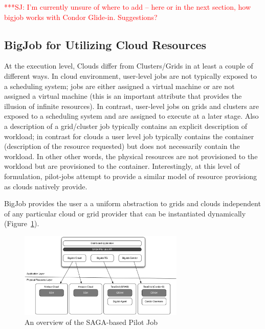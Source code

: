 \documentclass[conference,final]{IEEEtran}
\newcommand{\jhanote}[1]{ {\textcolor{red} { ***SJ: #1 }}}
\newcommand{\jhanote}[1]{}
\begin{document}
\jhanote{I'm currently unsure of where to add -- here or in the next
  section, how bigjob works with Condor Glide-in. Suggestions?}

\subsection{BigJob for Utilizing Cloud Resources}


At the execution level, Clouds differ from Clusters/Grids in at least
a couple of different ways. In cloud environment, user-level jobs are
not typically exposed to a scheduling system; jobs are either assigned
a virtual machine or are not assigned a virtual machine (this is an
important attribute that provides the illusion of infinite
resources). In contrast, user-level jobs on grids and clusters are
exposed to a scheduling system and are assigned to execute at a later
stage.  Also a description of a grid/cluster job typically contains an
explicit description of workload; in contrast for clouds a user level
job typically contains the container (description of the resource
requested) but does not necessarily contain the workload. In other
other words, the physical resources are not provisioned to the
workload but are provisioned to the container.  Interestingly, at this
level of formulation, pilot-jobs attempt to provide a similar model of
resource provisiong as clouds natively provide.

BigJob provides the user a a uniform abstraction to grids and clouds
independent of any particular cloud or grid provider that can be
instantiated dynamically
(Figure~\ref{fig:figures_distributed_pilot_job}).

\begin{figure}[htbp]
    \centering
        \includegraphics[width=0.7\textwidth]{figures/distributed_pilot_job.pdf}
    \caption{An overview of the SAGA-based Pilot Job}
    \label{fig:figures_distributed_pilot_job}
\end{figure}
\end{document}
